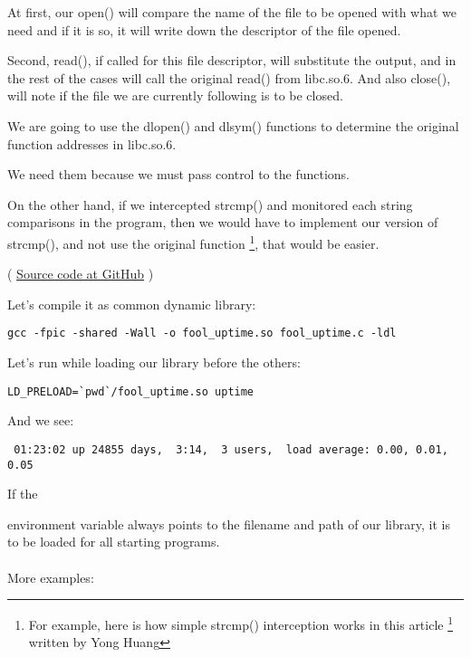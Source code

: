 At first, our open() will compare the name of the file to be opened with what we need and if it is so,
it will write down the descriptor of the file opened.

Second, read(), if called for this file descriptor, will substitute the output,
and in the rest of the cases will call the original read() from libc.so.6.
And also close(), 
will note if the file we are currently following is to be closed.


We are going to use the dlopen() and dlsym() functions to determine the original function addresses in libc.so.6.

We need them because we must pass control to the  functions.


On the other hand, if we intercepted strcmp() and monitored each string
comparisons in the program, then we would have to implement our version of strcmp(), and not
use the original function
\footnote{For example, here is how simple strcmp() interception works in this article
\footnote{\href{http://go.yurichev.com/17143}{yurichev.com}}
written by Yong Huang}, that would be easier.


( \href{https://github.com/DennisYurichev/RE-for-beginners/blob/master/OS/LD_PRELOAD/fool_uptime.c}{Source code at GitHub} )

Let's compile it as common dynamic library:

\begin{lstlisting}
gcc -fpic -shared -Wall -o fool_uptime.so fool_uptime.c -ldl
\end{lstlisting}

Let's run 
while loading our library before the others:

\begin{lstlisting}
LD_PRELOAD=`pwd`/fool_uptime.so uptime
\end{lstlisting}

And we see:

\begin{lstlisting}
 01:23:02 up 24855 days,  3:14,  3 users,  load average: 0.00, 0.01, 0.05
\end{lstlisting}

If the  

environment variable always points to the filename and path of our library, 
it is to be loaded for all starting programs. \\
\\
More examples:

